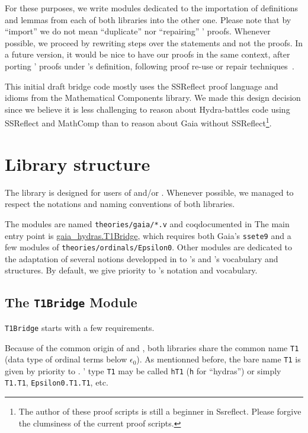 For these purposes, we write modules dedicated to the importation of definitions and lemmas from each of both libraries into the other one.
  Please note that by ``import'' we do not mean ``duplicate''
  nor ``repairing'' \HydrasLib' proofs.  Whenever possible, we proceed by rewriting steps over the statements and not the proofs. In a future version, it would be nice to have our proofs in the same context, after porting \HydrasLib' proofs under \gaia's
  definition, following  proof re-use or repair  techniques~\cite{Barthe2001, Magaud03a, ringer2021}.



This initial draft bridge code mostly uses the SSReflect proof language
and idioms from the Mathematical Components library. We made this design
decision since we believe it is less challenging to reason about
Hydra-battles code using SSReflect and MathComp than to reason about
Gaia without SSReflect\footnote{The author of these proof scripts is still a beginner in Ssreflect. Please forgive the clumsiness of the current proof scripts.}.

\section{Library structure}
The \gaiaHydras library is designed for users of
\gaia and/or  \HydrasLib. Whenever possible, we managed to respect the notations and naming conventions of both libraries.

The modules are named {\texttt{theories/gaia/*.v}} and coqdocumented in 
The main entry point is
\href{../theories/html/gaia_hydras.T1Bridge.html}{gaia\_hydras.T1Bridge}, which requires both Gaia's \texttt{ssete9} and a few modules of \texttt{theories/ordinals/Epsilon0}.
Other modules are dedicated to the adaptation of several notions developped in \HydrasLib to \mathcomp's and \gaia's vocabulary and structures.
By default, we give priority to \gaia's notation and vocabulary.


\subsection{The \texttt{T1Bridge} Module}

\texttt{T1Bridge} starts with a few requirements.

Because of the common origin of \HydrasLib and \gaia, both libraries share the common name \texttt{T1} (data type of ordinal terms below $\epsilon_0$). As mentionned before, the bare name \texttt{T1} is given by priority to \gaia.
\HydrasLib' type \texttt{T1} may be called \texttt{hT1}
(\texttt{h} for ``hydras'') or simply \texttt{T1.T1}, \texttt{Epsilon0.T1.T1}, etc.


